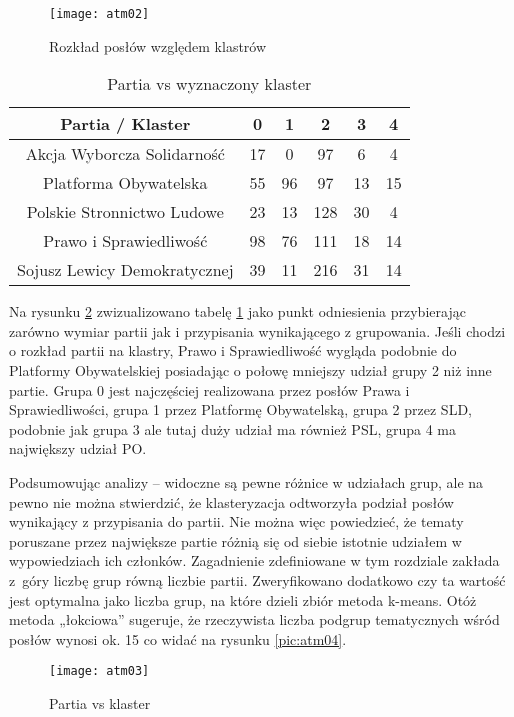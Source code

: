 \documentclass[a4paper,11pt,twoside]{report}
\theoremstyle{definition}
\begin{document}
\begin{figure}
\texttt{[image: atm02]} 
\centering \caption{Rozkład posłów względem klastrów}
 \label{pic:atm02}
\end{figure}

\begin{table}[h] \centering
\begin{tabular}{|c|c|c|c|c|c|} 
\hline
Partia / Klaster & 0 & 1 & 2 & 3 & 4  \\ \hline
Akcja Wyborcza Solidarność	 & 17	 &	0	 &	97	 & 6	 & 4\\ \hline
Platforma Obywatelska	 & 55	 & 96	 & 97	 & 13	 & 15\\ \hline
Polskie Stronnictwo Ludowe	 & 23	 & 13	 & 128	 & 30	 & 4\\ \hline
Prawo i Sprawiedliwość	 & 98	 & 76	 & 111	 & 18	 & 14\\ \hline
Sojusz Lewicy Demokratycznej	 & 39	 & 11	 & 216	 & 31	 & 14 \\ \hline 
\end{tabular} \caption{Partia vs wyznaczony klaster} \label{tab:atm01}
\end{table}

Na rysunku \ref{pic:atm03} zwizualizowano tabelę \ref{tab:atm01} jako punkt odniesienia przybierając zarówno wymiar partii jak i przypisania wynikającego z grupowania. Jeśli chodzi o rozkład partii na klastry, Prawo i Sprawiedliwość wygląda podobnie do Platformy Obywatelskiej posiadając o połowę mniejszy udział grupy 2 niż inne partie. Grupa 0 jest najczęściej realizowana przez posłów Prawa i Sprawiedliwości, grupa 1 przez Platformę Obywatelską, grupa 2 przez SLD, podobnie jak grupa 3 ale tutaj duży udział ma również PSL, grupa 4 ma największy udział PO. 

Podsumowując analizy – widoczne są pewne różnice w udziałach grup, ale na pewno nie można stwierdzić, że klasteryzacja odtworzyła podział posłów wynikający z przypisania do partii. Nie można więc powiedzieć, że tematy poruszane przez największe partie różnią się od siebie istotnie udziałem w wypowiedziach ich członków.
Zagadnienie zdefiniowane w tym rozdziale zakłada z~góry liczbę grup równą liczbie partii. Zweryfikowano dodatkowo czy ta wartość jest optymalna jako liczba grup, na które dzieli zbiór metoda k-means. Otóż metoda „łokciowa” sugeruje, że rzeczywista liczba podgrup tematycznych wśród posłów wynosi ok. 15 co widać na rysunku \ref{pic:atm04}. 


\begin{figure}
\texttt{[image: atm03]} 
\centering \caption{Partia vs klaster}
 \label{pic:atm03}
\end{figure}
\end{document}
